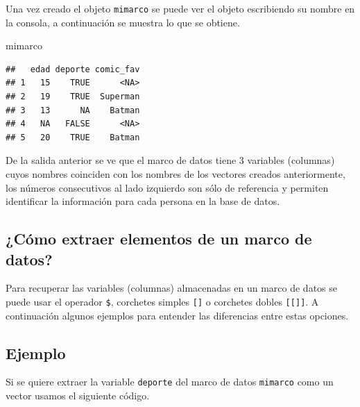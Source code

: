 \documentclass[
]{book}
\newenvironment{Shaded}{\begin{snugshade}}{\end{snugshade}}
\newcommand{\CommentTok}[1]{\textcolor[rgb]{0.56,0.35,0.01}{\textit{#1}}}
\newcommand{\NormalTok}[1]{#1}
\newcommand{\SpecialCharTok}[1]{\textcolor[rgb]{0.00,0.00,0.00}{#1}}
\begin{document}
Una vez creado el objeto \texttt{mimarco} se puede ver el objeto escribiendo su nombre en la consola, a continuación se muestra lo que se obtiene.

\begin{Shaded}
\begin{Highlighting}[]
\NormalTok{mimarco}
\end{Highlighting}
\end{Shaded}

\begin{verbatim}
##   edad deporte comic_fav
## 1   15    TRUE      <NA>
## 2   19    TRUE  Superman
## 3   13      NA    Batman
## 4   NA   FALSE      <NA>
## 5   20    TRUE    Batman
\end{verbatim}

De la salida anterior se ve que el marco de datos tiene 3 variables (columnas) cuyos nombres coinciden con los nombres de los vectores creados anteriormente, los números consecutivos al lado izquierdo son sólo de referencia y permiten identificar la información para cada persona en la base de datos.

\hypertarget{cuxf3mo-extraer-elementos-de-un-marco-de-datos}{%
\subsection{¿Cómo extraer elementos de un marco de datos?}\label{cuxf3mo-extraer-elementos-de-un-marco-de-datos}}

Para recuperar las variables (columnas) almacenadas en un marco de datos se puede usar el operador \texttt{\$}, corchetes simples \texttt{{[}{]}} o corchetes dobles \texttt{{[}{[}{]}{]}}. A continuación algunos ejemplos para entender las diferencias entre estas opciones.

\hypertarget{ejemplo-3}{%
\subsection*{Ejemplo}\label{ejemplo-3}}

Si se quiere extraer la variable \texttt{deporte} del marco de datos \texttt{mimarco} como un vector usamos el siguiente código.

\begin{Shaded}
\end{Shaded}
\end{document}
